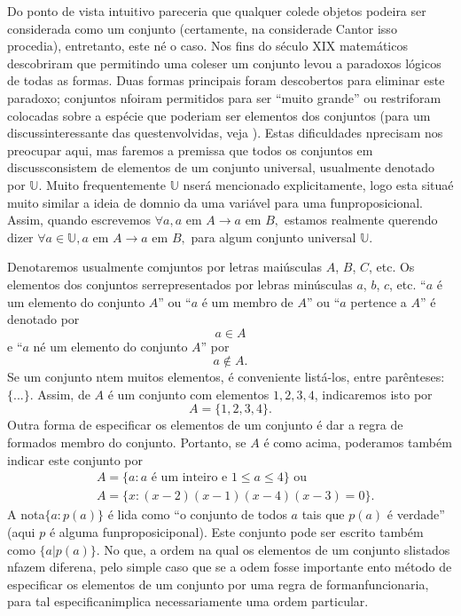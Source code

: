 Do ponto de vista intuitivo pareceria que qualquer cole\cao de objetos podeira ser considerada como um conjunto (certamente, na considera\cao de Cantor isso procedia), entretanto, este n\ao \'e o caso. Nos fins do s\'eculo XIX matem\'aticos descobriram que permitindo uma cole\cao ser um conjunto levou a paradoxos l\'ogicos de todas as formas. Duas formas principais foram descobertos para eliminar este paradoxo; conjuntos n\ao foiram permitidos para ser ``muito grande'' ou restri\coes foram  colocadas sobre a esp\'ecie que poderiam ser elementos dos conjuntos (para um discuss\ao interessante das quest\oes envolvidas, veja \cite{pinter:1971}). Estas dificuldades n\ao precisam nos preocupar aqui, mas faremos a premissa que todos os conjuntos em discuss\ao consistem de elementos de um conjunto universal, usualmente denotado por $\mathbb{U}$. Muito frequentemente $\mathbb{U}$ n\ao ser\'a  mencionado explicitamente, logo esta situa\cao \'e muito similar a ideia de dom\ih nio da uma vari\'avel para uma fun\cao proposicional. Assim, quando escrevemos $\forall a, a \textrm{ em } A\to a \textrm{ em } B,$ estamos realmente querendo dizer $\forall a\in\mathbb{U}, a \textrm{ em } A\to a \textrm{ em } B,$ para algum conjunto universal $\mathbb{U}$. 

Denotaremos usualmente comjuntos por letras mai\'usculas $A$, $B$, $C$, etc. Os elementos dos conjuntos ser\ao representados por lebras min\'usculas $a$, $b$, $c$, etc. ``$a$ \'e um elemento do conjunto $A$'' ou ``$a$ \'e um membro de $A$'' ou ``$a$ pertence a $A$'' \'e denotado por
\[
a\in A
\]
e ``$a$ n\ao \'e um elemento do conjunto $A$'' por
\[
a\notin A.
\]
Se um conjunto n\ao tem muitos elementos, \'e conveniente list\'a-los, entre par\^enteses: $\{...\}$. Assim, de $A$ \'e um conjunto com elementos $1,2,3,4$, indicaremos isto por
\[
A=\{1,2,3,4\}.
\]
Outra forma de especificar os elementos de um conjunto \'e dar a regra de forma\cao dos membro do conjunto. Portanto, se $A$ \'e como acima, poder\ih amos tamb\'em indicar este conjunto por
\begin{eqnarray*}
& A = \{a: a \textrm{ \'e um inteiro e } 1\leq a \leq 4\} \textrm{ ou }\\
& A = \{x: (x-2)(x-1)(x-4)(x-3)=0\}.
\end{eqnarray*}
A nota\cao $\{a:p(a)\}$ \'e lida como ``o conjunto de todos $a$ tais que $p(a)$ \'e verdade'' (aqui $p$ \'e alguma fun\cao proposiciponal). Este conjunto pode ser escrito tamb\'em como $\{a|p(a)\}$. No que, a ordem na qual os elementos de um conjunto s\ao listados n\ao fazem diferen\cc a, pelo simple caso que se a odem fosse importante ent\ao o m\'etodo de especificar os elementos de um conjunto  por uma regra de forma\cao n\ao funcionaria, para tal especifica\cao n\ao implica necessariamente uma ordem particular.


